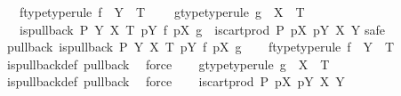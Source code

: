 \begin{isabellebody}
\ \ \ f{\isacharunderscore}{\kern0pt}type{\isacharbrackleft}{\kern0pt}type{\isacharunderscore}{\kern0pt}rule{\isacharbrackright}{\kern0pt}{\isacharcolon}{\kern0pt}\ {\isachardoublequoteopen}f\ {\isacharcolon}{\kern0pt}\ Y\ {\isasymrightarrow}\ T{\isachardoublequoteclose}\ \isanewline
\ \ \ g{\isacharunderscore}{\kern0pt}type{\isacharbrackleft}{\kern0pt}type{\isacharunderscore}{\kern0pt}rule{\isacharbrackright}{\kern0pt}{\isacharcolon}{\kern0pt}\ {\isachardoublequoteopen}g\ {\isacharcolon}{\kern0pt}\ X\ {\isasymrightarrow}\ T{\isachardoublequoteclose}\isanewline
\ \ \ {\isachardoublequoteopen}{\isacharparenleft}{\kern0pt}is{\isacharunderscore}{\kern0pt}pullback\ P\ Y\ X\ T\ {\isacharparenleft}{\kern0pt}pY{\isacharparenright}{\kern0pt}\ f\ {\isacharparenleft}{\kern0pt}pX{\isacharparenright}{\kern0pt}\ g{\isacharparenright}{\kern0pt}\ {\isacharequal}{\kern0pt}\ {\isacharparenleft}{\kern0pt}is{\isacharunderscore}{\kern0pt}cart{\isacharunderscore}{\kern0pt}prod\ P\ pX\ pY\ X\ Y{\isacharparenright}{\kern0pt}{\isachardoublequoteclose}\isanewline
%
\isadelimproof
%
\endisadelimproof
%
\isatagproof
{}\isamarkupfalse%
{\isacharparenleft}{\kern0pt}safe{\isacharparenright}{\kern0pt}\isanewline
\ \ \isamarkupfalse%
\ pullback{\isacharcolon}{\kern0pt}\ {\isachardoublequoteopen}is{\isacharunderscore}{\kern0pt}pullback\ P\ Y\ X\ T\ pY\ f\ pX\ g{\isachardoublequoteclose}\isanewline
\ \ \isamarkupfalse%
\ f{\isacharunderscore}{\kern0pt}type{\isacharbrackleft}{\kern0pt}type{\isacharunderscore}{\kern0pt}rule{\isacharbrackright}{\kern0pt}{\isacharcolon}{\kern0pt}\ {\isachardoublequoteopen}f\ {\isacharcolon}{\kern0pt}\ Y\ {\isasymrightarrow}\ T{\isachardoublequoteclose}\isanewline
\ \ \ \ \isamarkupfalse%
\ is{\isacharunderscore}{\kern0pt}pullback{\isacharunderscore}{\kern0pt}def\ pullback\ \isamarkupfalse%
\ force\isanewline
\ \ \isamarkupfalse%
\ g{\isacharunderscore}{\kern0pt}type{\isacharbrackleft}{\kern0pt}type{\isacharunderscore}{\kern0pt}rule{\isacharbrackright}{\kern0pt}{\isacharcolon}{\kern0pt}\ {\isachardoublequoteopen}g\ {\isacharcolon}{\kern0pt}\ X\ {\isasymrightarrow}\ T{\isachardoublequoteclose}\isanewline
\ \ \ \ \isamarkupfalse%
\ is{\isacharunderscore}{\kern0pt}pullback{\isacharunderscore}{\kern0pt}def\ pullback\ \isamarkupfalse%
\ force\isanewline
\ \ \isamarkupfalse%
\ {\isachardoublequoteopen}is{\isacharunderscore}{\kern0pt}cart{\isacharunderscore}{\kern0pt}prod\ P\ pX\ pY\ X\ Y{\isachardoublequoteclose}\isanewline

\end{isabellebody}
